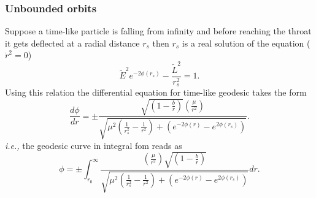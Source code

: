 \documentclass[10pt]{revtex4}
\begin{document}
\subsubsection{Unbounded orbits}
Suppose a time-like particle is falling from infinity and before reaching the throat it gets deflected at a radial distance $r_s$ then $r_s$ is a real solution of the equation ($\dot{r}^2=0$)
\begin{equation}
\tilde{E}^2e^{-2\phi(r_s)}-\frac{\tilde{L}^2}{r_s^2}=1.
\end{equation}
Using this relation the differential equation for time-like geodesic takes the form
\begin{equation}
\frac{d\phi}{dr}=\pm\frac{\sqrt{\left(1-\frac{b}{r}\right)}\left(\frac{\mu}{r^2}\right)}{\sqrt{\mu^2\left(\frac{1}{r_s^2}-\frac{1}{r^2}\right)+\left(e^{-2\phi(r)}-e^{2\phi(r_s)}\right)}}.
\end{equation} 
{\it i.e.,} the geodesic curve in integral fom reads as 
\begin{equation}
\phi=\pm\int_{r_0}^{\infty}\frac{\left(\frac{\mu}{r^2}\right)\sqrt{\left(1-\frac{b}{r}\right)}}{\sqrt{\mu^2\left(\frac{1}{r_s^2}-\frac{1}{r^2}\right)+\left(e^{-2\phi(r)}-e^{2\phi(r_s)}\right)}}dr.
\end{equation}
\end{document}
